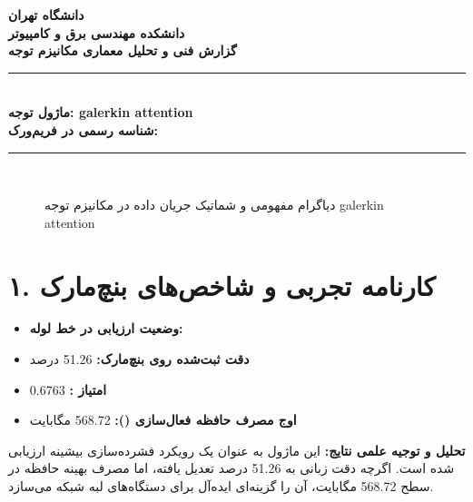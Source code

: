 \documentclass[12pt,a4paper]{article}
\begin{document}
\begin{center}
{\Large\bfseries دانشگاه تهران}\\[0.2cm]
{\large\bfseries دانشکده مهندسی برق و کامپیوتر}\\[0.2cm]
{\large\bfseries گزارش فنی و تحلیل معماری مکانیزم توجه}\\[0.5cm]
\rule{\linewidth}{1pt}\\[0.3cm]
{\LARGE\bfseries ماژول توجه: galerkin attention}\\[0.2cm]
{\large \textbf{شناسه رسمی در فریم‌ورک:} }\\[0.2cm]
\rule{\linewidth}{1pt}\\[0.5cm]
\end{center}

\begin{figure}[H]
\centering
{}
\caption{دیاگرام مفهومی و شماتیک جریان داده در مکانیزم توجه galerkin attention}
\end{figure}

\section*{۱. کارنامه تجربی و شاخص‌های بنچ‌مارک}
\begin{itemize}
\item \textbf{وضعیت ارزیابی در خط لوله:} 
\item \textbf{دقت ثبت‌شده روی بنچ‌مارک:} 51.26 درصد
\item \textbf{امتیاز :} 0.6763
\item \textbf{اوج مصرف حافظه فعال‌سازی ():} 568.72 مگابایت
\end{itemize}
\textbf{تحلیل و توجیه علمی نتایج:} این ماژول به عنوان یک رویکرد فشرده‌سازی بیشینه ارزیابی شده است. اگرچه دقت زبانی به 51.26 درصد تعدیل یافته، اما مصرف بهینه حافظه در سطح 568.72 مگابایت، آن را گزینه‌ای ایده‌آل برای دستگاه‌های لبه شبکه می‌سازد.
\end{document}
